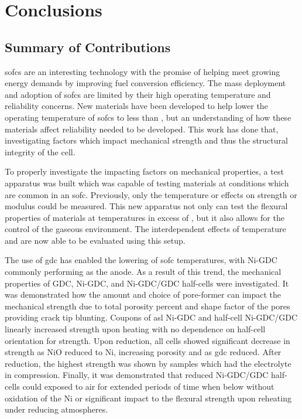 
\chapter{Conclusions}
\section{Summary of Contributions}%

\Glspl{sofc} are an interesting technology with the promise of helping meet growing energy demands by improving fuel conversion efficiency.
The mass deployment and adoption of \glspl{sofc} are limited by their high operating temperature and reliability concerns.
New materials have been developed to help lower the operating temperature of \glspl{sofc} to less than , but an understanding of how these materials affect reliability needed to be developed.
This work has done that, investigating factors which impact mechanical strength and thus the structural integrity of the cell.

To properly investigate the impacting factors on mechanical properties, a test apparatus was built which was capable of testing materials at conditions which are common in an \gls{sofc}.
Previously, only the temperature or  effects on strength or modulus could be measured.
This new apparatus not only can test the flexural properties of materials at temperatures in excess of , but it also allows for the control of the gaseous environment.
The interdependent effects of temperature and  are now able to be evaluated using this setup.

The use of \gls{gdc} has enabled the lowering of \gls{sofc} temperatures, with Ni-GDC commonly performing as the anode.
As a result of this trend, the mechanical properties of GDC, Ni-GDC, and Ni-GDC/GDC half-cells were investigated.
It was demonstrated how the amount and choice of pore-former can impact the mechanical strength due to total porosity percent and shape factor of the pores providing crack tip blunting.
Coupons of \gls{asl} Ni-GDC and half-cell Ni-GDC/GDC linearly increased strength upon heating with no dependence on half-cell orientation for strength.
Upon reduction, all cells showed significant decrease in strength as NiO reduced to Ni, increasing porosity and as \gls{gdc} reduced.
After reduction, the highest strength was shown by samples which had the electrolyte in compression.
Finally, it was demonstrated that reduced Ni-GDC/GDC half-cells could exposed to air for extended periods of time when below  without oxidation of the Ni or significant impact to the flexural strength upon reheating under reducing atmospheres.

